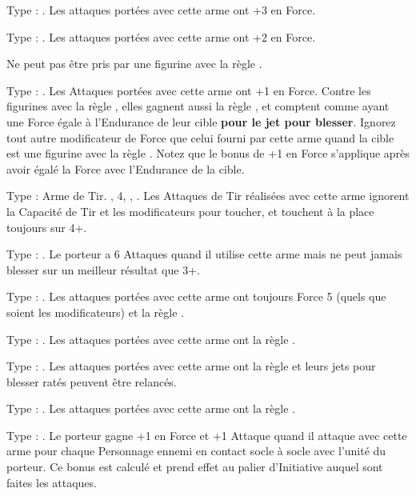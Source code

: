 Type : \hw{}.  Les attaques portées avec cette arme ont +3 en Force.

Type : \hw{}. Les attaques portées avec cette arme ont +2 en Force.

Ne peut pas être pris par une figurine avec la règle \toweringpresence{}.

Type : \hw{}. Les Attaques portées avec cette arme ont +1 en Force. Contre les figurines avec la règle \toweringpresence{}, elles gagnent aussi la règle , et comptent comme ayant une Force égale à l'Endurance de leur cible \textbf{pour le jet pour blesser}. Ignorez tout autre modificateur de Force que celui fourni par cette arme quand la cible est une figurine avec la règle \toweringpresence{}. Notez que le bonus de +1 en Force s'applique après avoir égalé la Force avec l'Endurance de la cible.

Type : Arme de Tir. , \Strength{} 4, , . Les Attaques de Tir réalisées avec cette arme ignorent la Capacité de Tir et les modificateurs pour toucher, et touchent à la place toujours sur 4+.

Type : \hw{}. Le porteur a 6 Attaques quand il utilise cette arme mais ne peut jamais blesser sur un meilleur résultat que 3+.

Type : \halberd{}. Les attaques portées avec cette arme ont toujours Force 5 (quels que soient les modificateurs) et la règle .

Type : \hw{}. Les attaques portées avec cette arme ont la règle .

Type : \hw{}. Les attaques portées avec cette arme ont la règle \divineattacks{} et leurs jets pour blesser ratés peuvent être relancés.

Type : \gw{}. Les attaques portées avec cette arme ont la règle .

Type : \hw{}. Le porteur gagne +1 en Force et +1 Attaque quand il attaque avec cette arme pour chaque Personnage ennemi en contact socle à socle avec l'unité du porteur. Ce bonus est calculé et prend effet au palier d'Initiative auquel sont faites les attaques.

